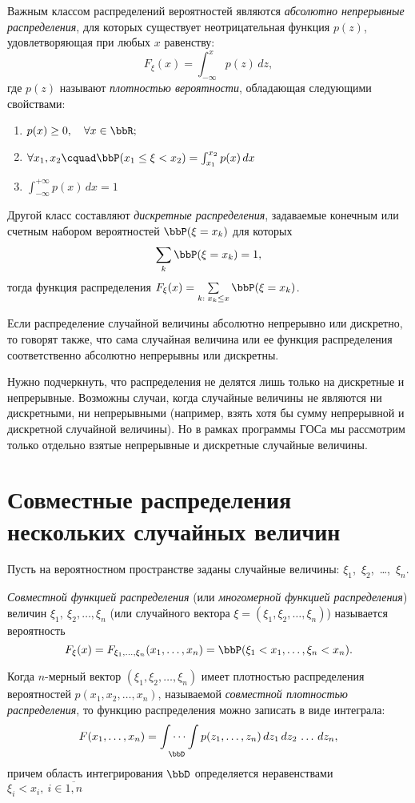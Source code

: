 Важным классом распределений вероятностей являются \textit{абсолютно непрерывные распределения}, для которых существует неотрицательная функция $p(z)$, удовлетворяющая при любых $x$ равенству:
$$F_\xi(x)=\int_{-\infty}^{x}p(z)\,dz,$$ где $p(z)$ называют \textit{плотностью вероятности}, обладающая следующими свойствами:
\begin{enumerate}
\item 
$p(x)\ge 0,\quad \forall x \in \bbR;$ 
\item 
$\forall x_1,x_2\cquad \bbP(x_1\le\xi<x_2)=\int_{x_1}^{x_2}p(x)\,dx$
\item
$\int_{-\infty}^{+\infty}p(x)\,dx=1$
\end{enumerate}

Другой класс составляют \textit{дискретные распределения}, задаваемые конечным или счетным набором вероятностей $\bbP(\xi = x_k)$ для которых
$$
\sum\limits_k \bbP(\xi=x_k)=1,
$$
тогда функция распределения $F_\xi(x)=\sum\limits_{k:\; x_k \le x} \bbP(\xi=x_k)$.

Если распределение случайной величины абсолютно непрерывно или дискретно, то говорят также, что сама случайная величина или ее функция распределения соответственно абсолютно непрерывны или дискретны.

Нужно подчеркнуть, что распределения не делятся лишь только на дискретные и непрерывные. Возможны случаи, когда случайные величины не являются ни дискретными, ни непрерывными (например, взять хотя бы сумму непрерывной и дискретной случайной величины). Но в рамках программы ГОСа мы рассмотрим только отдельно взятые непрерывные и дискретные случайные величины. 

\section{Совместные распределения нескольких случайных величин}
Пусть на вероятностном пространстве заданы случайные величины: $\xi_1$,~$\xi_2$,~\dots,~$\xi_n$.
\begin{defn}
\textit{Совместной функцией распределения} (или \textit{многомерной функцией распределения}) величин $\xi_1,~\xi_2,\dots,\xi_n$ (или случайного вектора $\xi = (\xi_1,\xi_2,\dots,\xi_n)$) называется вероятность 
$$
F_\xi(x)=F_{\xi_1,\dots,\xi_n}(x_1,\dots,x_n)=\bbP(\xi_1 < x_1,\dots,\xi_n<x_n).
$$
\end{defn}

Когда $n$-мерный вектор $(\xi_1,\xi_2,\dots,\xi_n)$ имеет плотностью распределения вероятностей $p(x_1,x_2,\dots,x_n)$, называемой \textit{совместной плотностью распределения}, то функцию распределения можно записать в виде интеграла:
$$
F(x_1,\dots,x_n)=\idotsint\limits_\bbD p(z_1,\dots,z_n)\,dz_1\,dz_2\,\dots\,dz_n,
$$
причем область интегрирования $\bbD$ определяется неравенствами $\xi_i<x_i,\ i\in \overline{1,n}$

